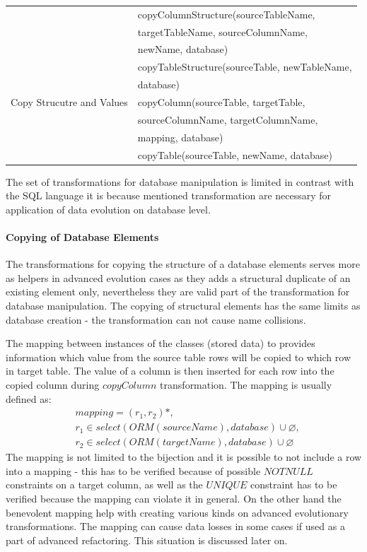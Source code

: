 \documentclass[runningheads]{comsis}
\begin{document}
\begin{table}
\begin{tabular}{ll}
	& copyColumnStructure(sourceTableName,\\ &  \hspace{0.5in} targetTableName,  sourceColumnName, \\ &  \hspace{0.5in} newName, database) \\
	& copyTableStructure(sourceTable, newTableName, \\ &  \hspace{0.5in} database) \\
	Copy Strucutre and Values
	& copyColumn(sourceTable, targetTable, \\
	& \hspace{0.5in} sourceColumnName, targetColumnName, \\ 
	& \hspace{0.5in} mapping, database) \\
	& copyTable(sourceTable, newName, database) \\
	\hline
	\end{tabular}
\end{table}
The set of transformations for database manipulation is limited in contrast with the SQL language it is because mentioned transformation are necessary for application of data evolution on database level. 

\paragraph{Copying of Database Elements} The transformations for copying the structure of a database elements serves more as helpers in advanced evolution cases as they adds a structural duplicate of an existing element only, nevertheless they are valid part of the transformation for database manipulation.  The copying of structural elements has the same limits as database creation - the transformation can not cause name collisions. 

The mapping between instances of the classes (stored data) to provides information which value from the source table rows will be copied to which row in target table. The value of a column is then inserted for each row into the copied column during $copyColumn$ transformation. 
The mapping is usually defined as: 
\begin{align}
&	mapping =  (r_1, r_2)*,\\
& 	r_1 \in select(ORM(sourceName), database) \cup \varnothing, \\
& 	r_2 \in select(ORM(targetName), database) \cup \varnothing
\end{align}
The mapping is not limited to the bijection and it is possible to not include a row into a mapping - this has to be verified because of possible $NOTNULL$ constraints on a target column, as well as the $UNIQUE$ constraint has to be verified because the mapping can violate it in general. On the other hand the benevolent mapping help with creating various kinds on advanced evolutionary transformations. The mapping can cause data losses in some cases if used as a part of advanced refactoring. This situation is discussed later on. 
\end{document}
